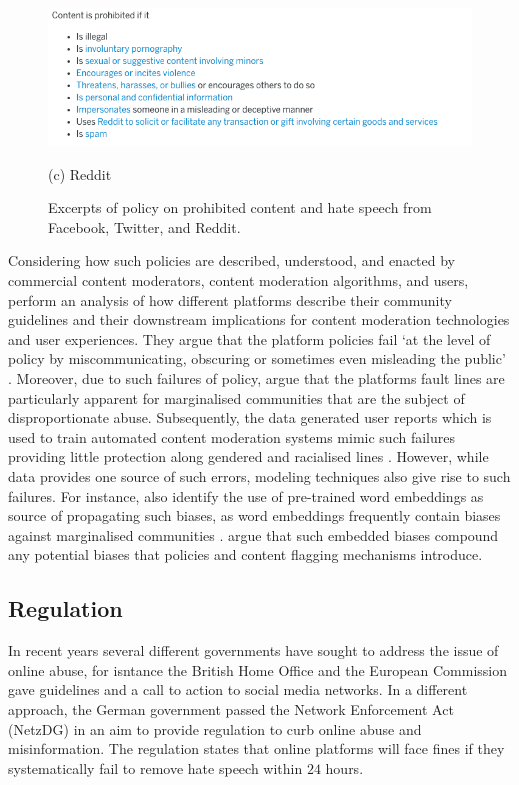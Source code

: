 \begin{figure}[!htb]
\begin{minipage}{0.32\textwidth}
    \includegraphics[width=\linewidth]{Chapter2/Figs/Reddit.png}
    \caption*{(c) Reddit}
  \end{minipage}\hfill
  \caption{Excerpts of policy on prohibited content and hate speech from Facebook, Twitter, and Reddit.}
  \label{fig:policies}
\end{figure}

Considering how such policies are described, understood, and enacted by commercial content moderators, content moderation algorithms, and users, \cite{Kirtz:2021} perform an analysis of how different platforms describe their community guidelines and their downstream implications for content moderation technologies and user experiences. They argue that the platform policies fail `at the level of policy by miscommunicating, obscuring or sometimes even misleading the public' \citep[p. 5]{Kirtz:2021}. Moreover, due to such failures of policy, \citet{Kirtz:2021} argue that the platforms fault lines are particularly apparent for marginalised communities that are the subject of disproportionate abuse. Subsequently, the data generated user reports which is used to train automated content moderation systems mimic such failures providing little protection along gendered and racialised lines \citep{Kirtz:2021,Waseem:2018}. However, while data provides one source of such errors, modeling techniques also give rise to such failures. For instance, \citet{Kirtz:2021} also identify the use of pre-trained word embeddings as source of propagating such biases, as word embeddings frequently contain biases against marginalised communities \citep{Speer:2017}. \citet{Kirtz:2021} argue that such embedded biases compound any potential biases that policies and content flagging mechanisms introduce.\vspace{5mm}

\subsection{Regulation}
In recent years several different governments have sought to address the issue of online abuse, for isntance the British Home Office \citep{HomeOffice:2016} and the European Commission \citep{EUCommission:2016} gave guidelines and a call to action to social media networks. In a different approach, the German government passed the Network Enforcement Act (NetzDG) \citep{NetzDG:2017} in an aim to provide regulation to curb online abuse and misinformation. The regulation states that online platforms will face fines if they systematically fail to remove hate speech within $24$ hours.\vspace{5mm}

